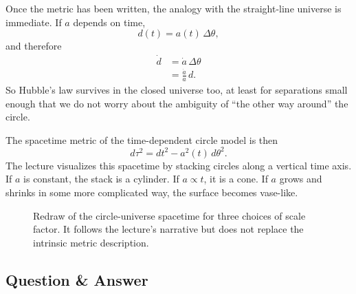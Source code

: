 Once the metric has been written, the analogy with the straight-line universe is immediate. If \(a\) depends on time,
\begin{equation}
d(t)=a(t)\,\Delta\theta,
\end{equation}
and therefore
\begin{align}
\dot d &= \dot a\,\Delta\theta \\
       &= \frac{\dot a}{a}\,d.
\end{align}
So Hubble's law survives in the closed universe too, at least for separations small enough that we do not worry about the ambiguity of ``the other way around'' the circle.

The spacetime metric of the time-dependent circle model is then
\begin{equation}
d\tau^2=dt^2-a^2(t)\,d\theta^2.
\end{equation}
The lecture visualizes this spacetime by stacking circles along a vertical time axis. If \(a\) is constant, the stack is a cylinder. If \(a\propto t\), it is a cone. If \(a\) grows and shrinks in some more complicated way, the surface becomes vase-like.

\begin{figure}
\centering
{}%
\caption{Redraw of the circle-universe spacetime for three choices of scale factor. It follows the lecture's narrative but does not replace the intrinsic metric description.}
\end{figure}

\subsection{Question \& Answer}

